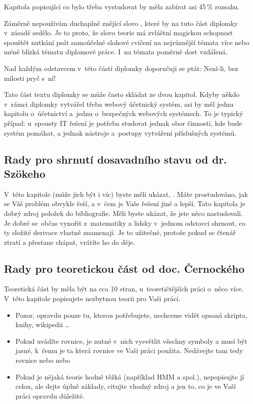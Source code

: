 Kapitola popisující co bylo třeba vystudovat by měla zabírat asi 45\,\% rozsahu.

Záměrně nepoužívám duchaplně znějící slovo , které by na tuto část diplomky v~zásadě sedělo. Je to proto, že slovo teorie má zvláštní magickou schopnost spouštět nutkání psát samoúčelné slohové cvičení na nejrůznější témata více nebo méně blízká tématu diplomové práce. I~na témata poměrně dost vzdálená.

Nad každým odstavcem v~této části diplomky doporučuji se ptát:  Není-li, bez milosti pryč s~ní!

Tato část textu diplomky se může často skládat ze dvou kapitol. Kdyby někdo v~rámci diplomky vytvářel třeba webový účetnický systém, asi by měl jednu kapitolu o~účetnictví a~jednu o~bezpečných webových systémech. To je typický případ: u~spousty IT řešení je potřeba studovat jednak obor činnosti, kde bude systém pomáhat, a jednak nástroje a~postupy vytváření příslušných systémů.

\subsection*{Rady pro shrnutí dosavadního stavu od dr. Szökeho}

V~této kapitole (může jich být i víc) byste měli ukázat, . Máte prostudováno, jak se Váš problém obvykle řeší, a v~čem je Vaše řešení jiné a lepší. Tato kapitola je dobrý zdroj položek do bibliografie. Měli byste ukázat, že jste něco nastudovali. Je dobré se~občas vynořit z~matematiky a lidsky v~jednom odstavci shrnout, co ty složité derivace vlastně znamenají. Je to užitečné, protože pokud se čtenář ztratí a přestane chápat, vrátíte ho do děje.

\subsection*{Rady pro teoretickou část od doc. Černockého}

Teoretická část by měla být na cca 10 stran, u~teoretičtějších práci o~něco více.
V~této kapitole popisujete nezbytnou teorii pro Vaši práci.
\begin{itemize}
  \item{Pozor, opravdu pouze tu, kterou potřebujete, nechceme vidět opsaná skripta, knihy, wikipedii \ldots}
  \item{Pokud uvádíte rovnice, je nutné v~nich vysvětlit všechny symboly a musí být jasné, k~čemu je ta která rovnice ve Vaši práci použita. Nedávejte tam tedy rovnice  nebo  nebo }
  \item{Pokud je nějaká teorie hodně těžká (například HMM a spol.), nepopisujte jí celou, ale dejte úplně základy, citujte vhodný zdroj a  jen to, co je ve Vaší práci opravdu důležité.}
\end{itemize}


